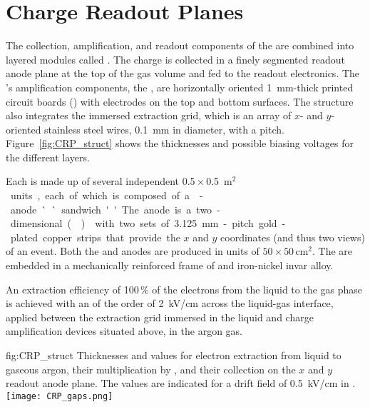 \section{Charge Readout Planes}
\label{sec:dp-execsum-crp}

The  collection, amplification, and readout components of the  are combined into  layered modules called . The charge is collected in a finely segmented readout anode plane at the top of the gas volume and fed to the  readout electronics. The  's amplification components, the , are horizontally oriented \SI{1}{mm}-thick printed circuit boards () with electrodes on the top and bottom surfaces.  
The  structure also integrates the immersed extraction grid, which is an array of $x$- and $y$-oriented stainless steel wires, \SI{0.1}{mm} in diameter, with a \dpstrippitch pitch. Figure~\ref{fig:CRP_struct} shows the thicknesses and possible biasing voltages for the different  layers.

Each  is made up of several independent \num{0.5}\,$\times$\,\SI{0.5}{m$^2$} units, each of which is composed  of a -anode ``sandwich.''  
The anode is a two-dimensional (\twod)  with two sets of \SI{3.125}{mm}-pitch gold-plated copper strips that provide the $x$ and $y$ coordinates (and thus two views) of an event. Both the  and anodes are produced in units of $50 \times 50\, $cm$^2$. 
The  are embedded in a mechanically reinforced frame of \frfour and iron-nickel invar alloy. 




An extraction efficiency of \num{100}\,\% of the electrons from the liquid to the gas phase is achieved with an \efield of the order of \SI{2}{kV/cm} across the liquid-gas interface, applied between the  extraction grid immersed in the liquid and charge amplification devices situated above, in the argon gas. 

\begin{dunefigure}{fig:CRP_struct}
{Thicknesses and  values for electron extraction from liquid to gaseous argon, their  multiplication by , and their collection on the $x$ and $y$ readout anode plane. The  values are indicated for a drift field of \SI{0.5}{kV/cm} in .}
\texttt{[image: CRP\_gaps.png]}
\end{dunefigure}

